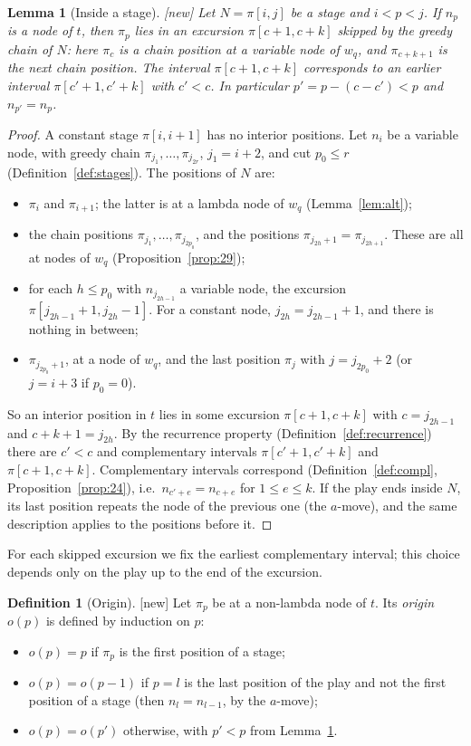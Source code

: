 \documentclass[11pt]{article}
\newcommand{\iv}[2]{\pi[#1,#2]}
\newcommand{\New}{\textsf{[new]}}
\theoremstyle{plain}
\newtheorem{lemma}[theorem]{Lemma}
\theoremstyle{definition}
\newtheorem{definition}[theorem]{Definition}
\theoremstyle{remark}
\begin{document}
\begin{lemma}[Inside a stage]\label{lem:inside}
\New{} Let $N=\iv ij$ be a stage and $i<p<j$.  If $n_p$ is a node of
$t$, then $\pi_p$ lies in an excursion $\iv{c+1}{c+k}$ skipped by the
greedy chain of $N$: here $\pi_c$ is a chain position at a variable node
of $w_q$, and $\pi_{c+k+1}$ is the next chain position.  The interval
$\iv{c+1}{c+k}$ corresponds to an earlier interval $\iv{c'+1}{c'+k}$
with $c'<c$.  In particular $p'=p-(c-c')<p$ and $n_{p'}=n_p$.
\end{lemma}
\begin{proof}
A constant stage $\iv i{i+1}$ has no interior positions.  Let $n_i$ be a
variable node, with greedy chain $\pi_{j_1},\dots,\pi_{j_{2r}}$,
$j_1=i+2$, and cut $p_0\le r$ (Definition~\ref{def:stages}).  The
positions of $N$ are:
\begin{itemize}
\item $\pi_i$ and $\pi_{i+1}$; the latter is at a lambda node of $w_q$
  (Lemma~\ref{lem:alt});
\item the chain positions $\pi_{j_1},\dots,\pi_{j_{2p_0}}$, and the
  positions $\pi_{j_{2h}+1}=\pi_{j_{2h+1}}$.  These are all at nodes of
  $w_q$ (Proposition~\ref{prop:29});
\item for each $h\le p_0$ with $n_{j_{2h-1}}$ a variable node, the
  excursion $\iv{j_{2h-1}+1}{j_{2h}-1}$.  For a constant node,
  $j_{2h}=j_{2h-1}+1$, and there is nothing in between;
\item $\pi_{j_{2p_0}+1}$, at a node of $w_q$, and the last position
  $\pi_j$ with $j=j_{2p_0}+2$ (or $j=i+3$ if $p_0=0$).
\end{itemize}
So an interior position in $t$ lies in some excursion
$\iv{c+1}{c+k}$ with $c=j_{2h-1}$ and $c+k+1=j_{2h}$.  By the
recurrence property (Definition~\ref{def:recurrence}) there are $c'<c$
and complementary intervals $\iv{c'+1}{c'+k}$ and $\iv{c+1}{c+k}$.
Complementary intervals correspond (Definition~\ref{def:compl},
Proposition~\ref{prop:24}), i.e.\ $n_{c'+e}=n_{c+e}$ for $1\le e\le k$.
If the play ends inside $N$, its last position repeats the node of the
previous one (the $a$-move), and the same description applies to the
positions before it.
\end{proof}

For each skipped excursion we fix the earliest complementary interval;
this choice depends only on the play up to the end of the excursion.

\begin{definition}[Origin]\label{def:origin}
\New{} Let $\pi_p$ be at a non-lambda node of $t$.  Its \emph{origin}
$o(p)$ is defined by induction on $p$:
\begin{itemize}
\item $o(p)=p$ if $\pi_p$ is the first position of a stage;
\item $o(p)=o(p-1)$ if $p=l$ is the last position of the play and not
  the first position of a stage (then $n_l=n_{l-1}$, by the $a$-move);
\item $o(p)=o(p')$ otherwise, with $p'<p$ from Lemma~\ref{lem:inside}.
\end{itemize}
\end{definition}
\end{document}
